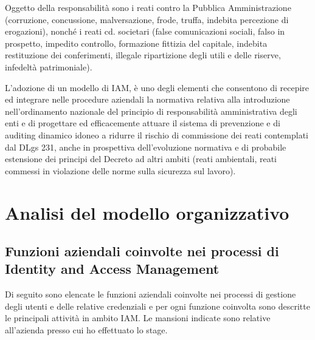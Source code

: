 Oggetto della responsabilit\`a sono i reati contro la Pubblica Amministrazione
(corruzione, concussione, malversazione, frode, truffa, indebita percezione di
erogazioni), nonch\'e i reati cd. societari (false comunicazioni sociali, falso
in prospetto, impedito controllo, formazione fittizia del capitale, indebita
restituzione dei conferimenti, illegale ripartizione degli utili e delle
riserve, infedelt\`a patrimoniale).

L'adozione di un modello di IAM, \`e uno degli elementi che consentono di
recepire ed integrare nelle procedure aziendali la normativa relativa alla
introduzione nell'ordinamento nazionale del principio di responsabilit\`a
amministrativa degli enti e di progettare ed efficacemente attuare il sistema di
prevenzione e di auditing dinamico idoneo a ridurre il rischio di commissione
dei reati contemplati dal DLgs 231, anche in prospettiva
dell'evoluzione normativa e di probabile estensione dei principi del Decreto ad
altri ambiti (reati ambientali, reati commessi in violazione delle norme sulla
sicurezza sul lavoro).

\section{Analisi del modello organizzativo}

\subsection{Funzioni aziendali coinvolte nei processi di Identity and Access Management}

Di seguito sono elencate le funzioni aziendali coinvolte nei processi di
gestione degli utenti e delle relative credenziali e per ogni funzione
coinvolta sono descritte le principali attivit\`a in ambito IAM.
Le mansioni indicate sono relative all'azienda presso cui ho effettuato lo
stage.

